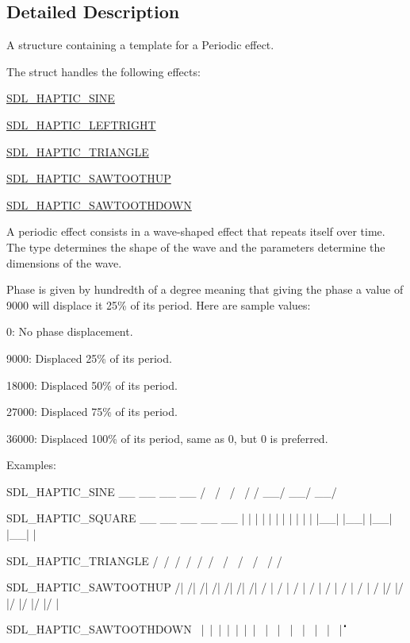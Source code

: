 \subsection{Detailed Description}
A structure containing a template for a Periodic effect. 

The struct handles the following effects\+:
\begin{DoxyItemize}
\item \mbox{\hyperlink{_s_d_l__haptic_8h_aa6d75adbfcdda5075078e7a2849da5c0}{S\+D\+L\+\_\+\+H\+A\+P\+T\+I\+C\+\_\+\+S\+I\+NE}}
\item \mbox{\hyperlink{_s_d_l__haptic_8h_ae047624d8458ff6400887c37a36f86d3}{S\+D\+L\+\_\+\+H\+A\+P\+T\+I\+C\+\_\+\+L\+E\+F\+T\+R\+I\+G\+HT}}
\item \mbox{\hyperlink{_s_d_l__haptic_8h_ae8123eaa51511507375ba6ef9220fa46}{S\+D\+L\+\_\+\+H\+A\+P\+T\+I\+C\+\_\+\+T\+R\+I\+A\+N\+G\+LE}}
\item \mbox{\hyperlink{_s_d_l__haptic_8h_ab8e3f40f3c2bcee8905d13b634363c3f}{S\+D\+L\+\_\+\+H\+A\+P\+T\+I\+C\+\_\+\+S\+A\+W\+T\+O\+O\+T\+H\+UP}}
\item \mbox{\hyperlink{_s_d_l__haptic_8h_afd64aa747034a7ccf4b55f6246525701}{S\+D\+L\+\_\+\+H\+A\+P\+T\+I\+C\+\_\+\+S\+A\+W\+T\+O\+O\+T\+H\+D\+O\+WN}}
\end{DoxyItemize}

A periodic effect consists in a wave-\/shaped effect that repeats itself over time. The type determines the shape of the wave and the parameters determine the dimensions of the wave.

Phase is given by hundredth of a degree meaning that giving the phase a value of 9000 will displace it 25\% of its period. Here are sample values\+:
\begin{DoxyItemize}
\item 0\+: No phase displacement.
\item 9000\+: Displaced 25\% of its period.
\item 18000\+: Displaced 50\% of its period.
\item 27000\+: Displaced 75\% of its period.
\item 36000\+: Displaced 100\% of its period, same as 0, but 0 is preferred.
\end{DoxyItemize}

Examples\+: \begin{DoxyVerb}SDL_HAPTIC_SINE
  __      __      __      __
 /  \    /  \    /  \    /
/    \__/    \__/    \__/

SDL_HAPTIC_SQUARE
 __    __    __    __    __
|  |  |  |  |  |  |  |  |  |
|  |__|  |__|  |__|  |__|  |

SDL_HAPTIC_TRIANGLE
  /\    /\    /\    /\    /\
 /  \  /  \  /  \  /  \  /
/    \/    \/    \/    \/

SDL_HAPTIC_SAWTOOTHUP
  /|  /|  /|  /|  /|  /|  /|
 / | / | / | / | / | / | / |
/  |/  |/  |/  |/  |/  |/  |

SDL_HAPTIC_SAWTOOTHDOWN
\  |\  |\  |\  |\  |\  |\  |
 \ | \ | \ | \ | \ | \ | \ |
  \|  \|  \|  \|  \|  \|  \|
\end{DoxyVerb}


